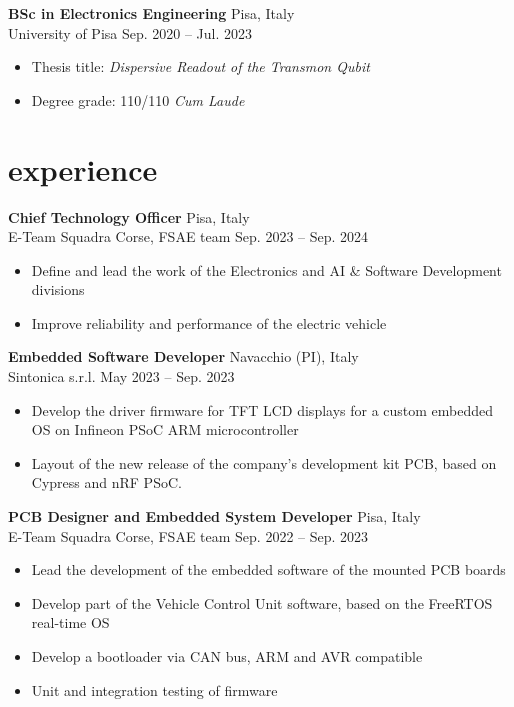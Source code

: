 \documentclass[10pt]{article}
\newcommand{\entry}[4]{{{\textbf{#1}}} \hfill #3 \\ #2 \hfill #4}
\begin{document}
\smallskip

\entry{BSc in Electronics Engineering}{University of Pisa}{Pisa, Italy}{Sep. 2020 -- Jul. 2023}
\begin{itemize}[noitemsep,leftmargin=3.5mm,rightmargin=0mm,topsep=6pt]
  \item Thesis title: \textit{Dispersive Readout of  the Transmon Qubit}
  \item Degree grade: 110/110 \textit{Cum Laude}

\end{itemize}

\section{experience}

\entry{Chief Technology Officer}{E-Team Squadra Corse, FSAE team}{Pisa, Italy}{Sep. 2023 -- Sep. 2024}
\begin{itemize}[noitemsep,leftmargin=3.5mm,rightmargin=0mm,topsep=6pt]
    \item Define and lead the work of the Electronics and AI \& Software Development divisions
    \item Improve reliability and performance of the electric vehicle 
\end{itemize}

\smallskip

\entry{Embedded Software Developer}{Sintonica s.r.l.}{Navacchio (PI), Italy}{May 2023 -- Sep. 2023}
\begin{itemize}[noitemsep,leftmargin=3.5mm,rightmargin=0mm,topsep=6pt]
    \item Develop the driver firmware for TFT LCD displays for a custom embedded OS on Infineon PSoC ARM microcontroller
    \item Layout of the new release of the company's development kit PCB, based on Cypress and nRF PSoC.
\end{itemize}

\smallskip

\entry{PCB Designer and Embedded System Developer}{E-Team Squadra Corse, FSAE team}{Pisa, Italy}{Sep. 2022 -- Sep. 2023}
\begin{itemize}[noitemsep,leftmargin=3.5mm,rightmargin=0mm,topsep=6pt]
    \item Lead the development of the embedded software of the mounted PCB boards
    \item Develop part of the Vehicle Control Unit software, based on the FreeRTOS real-time OS
    \item Develop a bootloader via CAN bus, ARM and AVR compatible
    \item Unit and integration testing of firmware
\end{itemize}
\end{document}
